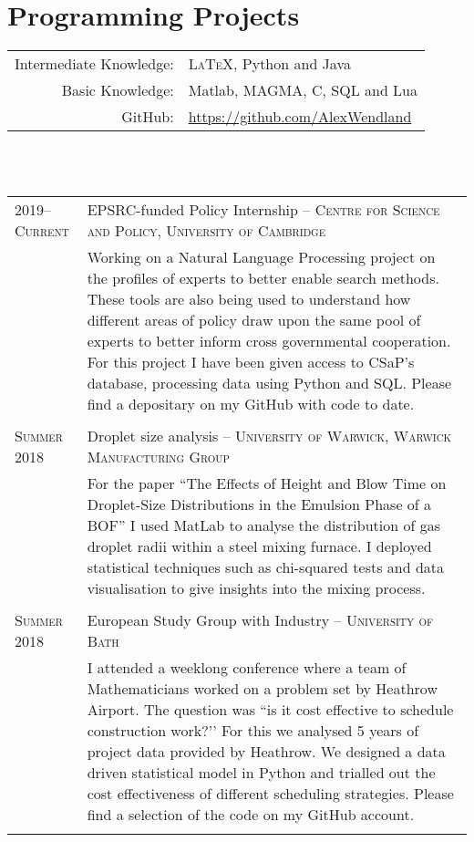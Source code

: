 \documentclass[a4paper,10pt]{article}
\begin{document}
\section{Programming Projects}
\begin{tabular}{rl}
	Intermediate Knowledge:&  \textsc{LaTeX}, Python and Java\\
	Basic Knowledge:& Matlab, \textsc{MAGMA}, C, SQL and Lua\\
	GitHub:& \href{https://github.com/AlexWendland}{https://github.com/AlexWendland}
\end{tabular}\\
\vspace{0.1 in}\\
\begin{tabular}{p{2.25cm}|p{15cm}}
	\textsc{2019--Current} & EPSRC-funded Policy Internship -- \textsc{Centre for Science and Policy, University of Cambridge}\\&\footnotesize{Working on a Natural Language Processing project on the profiles of experts to better enable search methods. These tools are also being used to understand how different areas of policy draw upon the same pool of experts to better inform cross governmental cooperation. For this project I have been given access to CSaP's database, processing data using Python and SQL. Please find a depositary on my GitHub with code to date.}\\\multicolumn{2}{c}{} \\
	\textsc{Summer 2018}& Droplet size analysis -- \textsc{University of Warwick, Warwick Manufacturing Group}\\&\footnotesize{For the paper ``The Effects of Height and Blow Time on Droplet-Size Distributions in the Emulsion Phase of a BOF'' I used MatLab to analyse the distribution of gas droplet radii within a steel mixing furnace. I deployed statistical techniques such as chi-squared tests and data visualisation to give insights into the mixing process.}\\\multicolumn{2}{c}{} \\
	\textsc{Summer 2018} & European Study Group with Industry -- \textsc{University of Bath} \\&\footnotesize{I attended a weeklong conference where a team of Mathematicians worked on a problem set by Heathrow Airport. The question was ``is it cost effective to schedule construction work?’’ For this we analysed 5 years of project data provided by Heathrow. We designed a data driven statistical model in Python and trialled out the cost effectiveness of different scheduling strategies. Please find a selection of the code on my GitHub account.}\\\multicolumn{2}{c}{} \\
\end{tabular}
\end{document}
